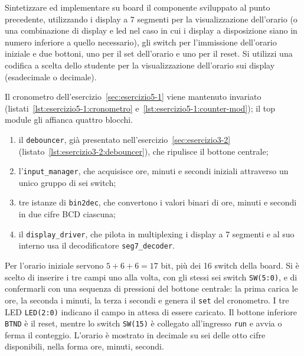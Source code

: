 \label{sec:esercizio5-2}

\begin{traccia}
Sintetizzare ed implementare su board il componente sviluppato al punto precedente, utilizzando i display a 7 segmenti per la visualizzazione dell'orario (o una combinazione di display e led nel caso in cui i display a disposizione siano in numero inferiore a quello necessario), gli switch per l'immissione dell'orario iniziale e due bottoni, uno per il set dell'orario e uno per il reset. Si utilizzi una codifica a scelta dello studente per la visualizzazione dell'orario sui display (esadecimale o decimale).
\end{traccia}

\progetto

Il cronometro dell'esercizio~\ref{sec:esercizio5-1} viene mantenuto invariato (listati~\ref{lst:esercizio5-1:cronometro} e~\ref{lst:esercizio5-1:counter-mod}); il top module gli affianca quattro blocchi.

\begin{enumerate}
  \item il \texttt{debouncer}, già presentato nell'esercizio~\ref{sec:esercizio3-2} (listato~\ref{lst:esercizio3-2:debouncer}), che ripulisce il bottone centrale;
  \item l'\texttt{input\_manager}, che acquisisce ore, minuti e secondi iniziali attraverso un unico gruppo di sei switch;
  \item tre istanze di \texttt{bin2dec}, che convertono i valori binari di ore, minuti e secondi in due cifre BCD ciascuna;
  \item il \texttt{display\_driver}, che pilota in multiplexing i display a 7 segmenti e al suo interno usa il decodificatore \texttt{seg7\_decoder}.
\end{enumerate}

Per l'orario iniziale servono $5+6+6=17$ bit, più dei 16 switch della board. Si è scelto di inserire i tre campi uno alla volta, con gli stessi sei switch \texttt{SW(5:0)}, e di confermarli con una sequenza di pressioni del bottone centrale: la prima carica le ore, la seconda i minuti, la terza i secondi e genera il \texttt{set} del cronometro. I tre LED \texttt{LED(2:0)} indicano il campo in attesa di essere caricato. Il bottone inferiore \texttt{BTND} è il reset, mentre lo switch \texttt{SW(15)} è collegato all'ingresso \texttt{run} e avvia o ferma il conteggio. L'orario è mostrato in decimale su sei delle otto cifre disponibili, nella forma ore, minuti, secondi.

